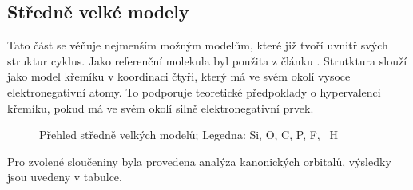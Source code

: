 \documentclass[
  digital, %
  table,   %
  lof,     %
  lot,     %
  oneside,
]{fithesis3}
\begin{document}
\subsection{Středně velké modely}
Tato část se věňuje nejmenším možným modelům, které již tvoří uvnitř svých struktur cyklus. Jako referenční molekula byl použita  z článku \cite{Chipanina2011}. Strutktura  slouží jako model křemíku v koordinaci čtyři, který má ve svém okolí vysoce elektronegativní atomy. To podporuje teoretické předpoklady o hypervalenci křemíku, pokud má ve svém okolí silně elektronegativní prvek.
\begin{figure}
\begin{center}
\caption{Přehled středně velkých modelů;  Legedna:  Si,  O,  C,  P,  F, ~H}
\label{prehled_middle}
\end{center}
\end{figure}
Pro zvolené sloučeniny byla provedena analýza kanonických orbitalů, výsledky jsou uvedeny v tabulce.
\end{document}
